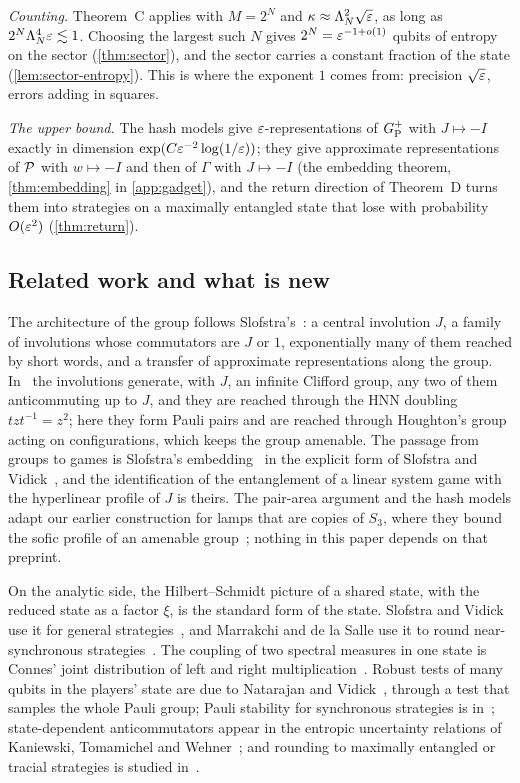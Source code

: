 \emph{Counting.} Theorem~C applies with $M=2^N$ and $\kappa\approx\Lambda_N^2\sqrt{\varepsilon}$, as long as $2^N\Lambda_N^4\varepsilon\lesssim1$. Choosing the
largest such $N$ gives $2^N=\varepsilon^{-1+o(1)}$ qubits of entropy on the sector (\cref{thm:sector}), and the sector carries a constant fraction of
the state (\cref{lem:sector-entropy}). This is where the exponent $1$ comes from: precision $\sqrt{\varepsilon}$, errors adding in squares.

\emph{The upper bound.} The hash models give $\varepsilon$-representations of $G_{\mathrm P}^{+}$ with $J\mapsto-I$ exactly in dimension
$\exp(C\varepsilon^{-2}\log(1/\varepsilon))$; they give approximate representations of $\mathcal P$ with $w\mapsto-I$ and then of $\Gamma$ with $J\mapsto-I$
(the embedding theorem, \cref{thm:embedding} in \cref{app:gadget}), and the return direction of
Theorem~D turns them into strategies on a maximally entangled state that lose with probability $O(\varepsilon^2)$ (\cref{thm:return}).

\subsection{Related work and what is new}

The architecture of the group follows Slofstra's~\cite{Slo18}: a central involution $J$, a family of involutions whose commutators are
$J$ or $1$, exponentially many of them reached by short words, and a transfer of approximate representations along the group.
In~\cite{Slo18} the involutions generate, with $J$, an infinite Clifford group, any two of them anticommuting up to $J$, and they are
reached through the HNN doubling $tzt^{-1}=z^2$; here they form Pauli pairs and are reached through Houghton's group acting on
configurations, which keeps the group amenable. The passage from groups to games is Slofstra's embedding~\cite{Slo19,Slo20} in the explicit form of Slofstra and
Vidick~\cite{SV18}, and the identification of the entanglement of a linear system game with the hyperlinear profile of $J$ is theirs. The
pair-area argument and the hash models adapt our earlier construction for lamps that are copies of $S_3$, where they bound the sofic profile
of an amenable group~\cite{DM-lamps}; nothing in this paper depends on that preprint.

On the analytic side, the Hilbert--Schmidt picture of a shared state, with the reduced state as a factor $\xi$, is the standard form of the
state. Slofstra and Vidick use it for general strategies~\cite{SV18}, and Marrakchi and de la Salle use it to round near-synchronous
strategies~\cite{MdlS23}. The coupling of two spectral measures in one state is Connes' joint distribution of left and right
multiplication~\cite{Con76}. Robust tests of many qubits in the players' state are due to Natarajan and Vidick~\cite{NV17}, through a test
that samples the whole Pauli group; Pauli stability for synchronous strategies is in~\cite{dlS22}; state-dependent anticommutators appear in
the entropic uncertainty relations of Kaniewski, Tomamichel and Wehner~\cite{KTW14}; and rounding to maximally entangled or tracial strategies
is studied in~\cite{Vid22,Pad22,Lin23,MdlS23}.

